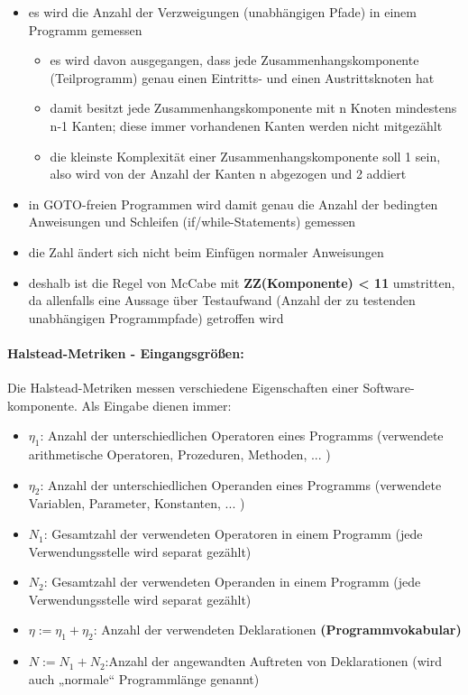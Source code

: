 \begin{itemize}
	\item es wird die Anzahl der Verzweigungen (unabhängigen Pfade) in einem Programm gemessen
	\begin{itemize}
		\item es wird davon ausgegangen, dass jede Zusammenhangskomponente (Teilprogramm) genau einen Eintritts- und einen Austrittsknoten hat
		\item damit besitzt jede Zusammenhangskomponente mit n Knoten mindestens n-1 Kanten; diese immer vorhandenen Kanten werden nicht mitgezählt
		\item die kleinste Komplexität einer Zusammenhangskomponente soll 1 sein, also wird von der Anzahl der Kanten n abgezogen und 2 addiert
	\end{itemize}
	\item in GOTO-freien Programmen wird damit genau die Anzahl der bedingten Anweisungen und Schleifen (if/while-Statements) gemessen
	\item die Zahl ändert sich nicht beim Einfügen normaler Anweisungen
	\item deshalb ist die Regel von McCabe mit \textbf{ZZ(Komponente) < 11} umstritten, da allenfalls eine Aussage über Testaufwand (Anzahl der zu testenden unabhängigen Programmpfade) getroffen wird
\end{itemize}

\paragraph{Halstead-Metriken - Eingangsgrößen:}

Die Halstead-Metriken messen verschiedene Eigenschaften einer Software-komponente. Als Eingabe dienen immer:
\begin{itemize}
	\item $\eta_{1}$: Anzahl der unterschiedlichen Operatoren eines Programms (verwendete arithmetische Operatoren, Prozeduren, Methoden, ... )
	\item $\eta_{2}$: Anzahl der unterschiedlichen Operanden eines Programms (verwendete Variablen, Parameter, Konstanten, ... )
	\item $N_{1}$: Gesamtzahl der verwendeten Operatoren in einem Programm (jede Verwendungsstelle wird separat gezählt)
	\item $N_{2}$:  Gesamtzahl der verwendeten Operanden in einem Programm (jede Verwendungsstelle wird separat gezählt)
	\item $\eta := \eta_{1}+\eta_{2}$:  Anzahl der verwendeten Deklarationen \textbf{(Programmvokabular)}
	\item $N := N_{1} + N_{2}$:Anzahl der angewandten Auftreten von Deklarationen (wird auch „normale“ Programmlänge genannt)
\end{itemize}

